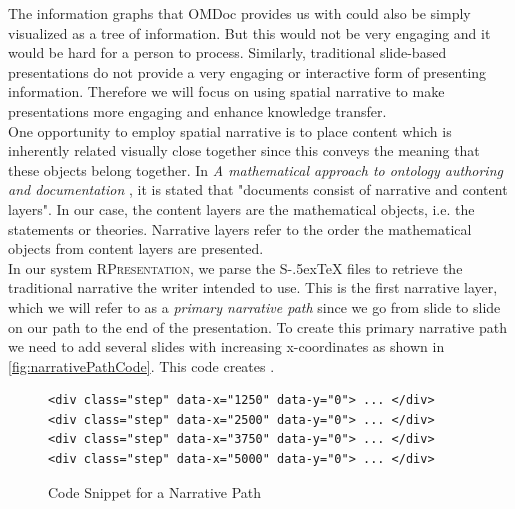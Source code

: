 \documentclass[twoside, 12pt]{article}
\def\stex{\texorpdfstring{\raisebox{-.5ex}S\kern-.5ex\TeX}{sTeX}\xspace}
\newcommand{\sys}{\textsc{RPresentation}\xspace}
\begin{document}
The information graphs that OMDoc provides us with could also be simply visualized as a tree of information. But this would not be very engaging and it would be hard for a person to process. Similarly, traditional slide-based presentations do not provide a very engaging or interactive form of presenting information. Therefore we will focus on using spatial narrative to make presentations more engaging and enhance knowledge transfer.\\ 

One opportunity to employ spatial narrative is to place content which is inherently related visually close together since this conveys the meaning that these objects belong together. In \textit{A mathematical approach to ontology authoring and documentation} \cite{LK:MathOntoAuthDoc09}, it is stated that "documents consist of narrative and content layers". In our case, the content layers are the mathematical objects, i.e. the statements or theories. Narrative layers refer to the order the mathematical objects from content layers are presented.\\

In our system \sys, we parse the \stex files to retrieve the traditional narrative the writer intended to use. This is the first narrative layer, which we will refer to as a \textit{primary narrative path} since we go from slide to slide on our path to the end of the presentation. To create this primary narrative path we need to add several slides with increasing x-coordinates as shown in \autoref{fig:narrativePathCode}. This code creates . \\

\begin{figure}
\vspace{-26pt}
\begin{verbatim}
<div class="step" data-x="1250" data-y="0"> ... </div>
<div class="step" data-x="2500" data-y="0"> ... </div>
<div class="step" data-x="3750" data-y="0"> ... </div>
<div class="step" data-x="5000" data-y="0"> ... </div>
\end{verbatim}
\vspace{-5pt}
  \caption{Code Snippet for a Narrative Path}
  \label{fig:narrativePathCode}
  \vspace{12pt}
\end{figure}

\begin{figure}
\vspace{-50pt}
\end{figure}
\end{document}
